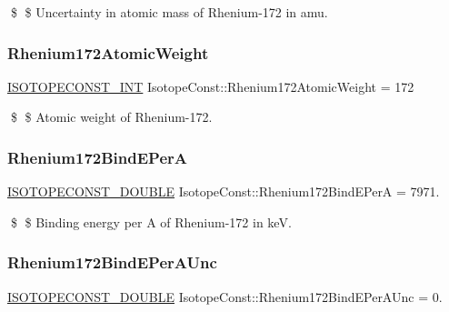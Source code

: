 \$ \$ Uncertainty in atomic mass of Rhenium-\/172 in amu. \mbox{\label{group___isotope_const-_rhenium-_re172_ga01cd3f491fcc9c1dd089a01e3f6467a4}} 
\subsubsection{\texorpdfstring{Rhenium172\+Atomic\+Weight}{Rhenium172AtomicWeight}}
{\footnotesize\ttfamily \mbox{\hyperlink{group___isotope_const-_macros_ga5f18360b3e99483a35c32d789e62621c}{I\+S\+O\+T\+O\+P\+E\+C\+O\+N\+S\+T\+\_\+\+I\+NT}} Isotope\+Const\+::\+Rhenium172\+Atomic\+Weight = 172}

\$ \$ Atomic weight of Rhenium-\/172. \mbox{\label{group___isotope_const-_rhenium-_re172_gaac0693e00ed2e09af8efcd5f9b8f5b4c}} 
\subsubsection{\texorpdfstring{Rhenium172\+Bind\+E\+PerA}{Rhenium172BindEPerA}}
{\footnotesize\ttfamily \mbox{\hyperlink{group___isotope_const-_macros_ga8f45a7272ce02c0b4c65c44636ed719a}{I\+S\+O\+T\+O\+P\+E\+C\+O\+N\+S\+T\+\_\+\+D\+O\+U\+B\+LE}} Isotope\+Const\+::\+Rhenium172\+Bind\+E\+PerA = 7971.}

\$ \$ Binding energy per A of Rhenium-\/172 in keV. \mbox{\label{group___isotope_const-_rhenium-_re172_gaf39e3bcfd6c79bca5f91f6cb075c4eee}} 
\subsubsection{\texorpdfstring{Rhenium172\+Bind\+E\+Per\+A\+Unc}{Rhenium172BindEPerAUnc}}
{\footnotesize\ttfamily \mbox{\hyperlink{group___isotope_const-_macros_ga8f45a7272ce02c0b4c65c44636ed719a}{I\+S\+O\+T\+O\+P\+E\+C\+O\+N\+S\+T\+\_\+\+D\+O\+U\+B\+LE}} Isotope\+Const\+::\+Rhenium172\+Bind\+E\+Per\+A\+Unc = 0.}

